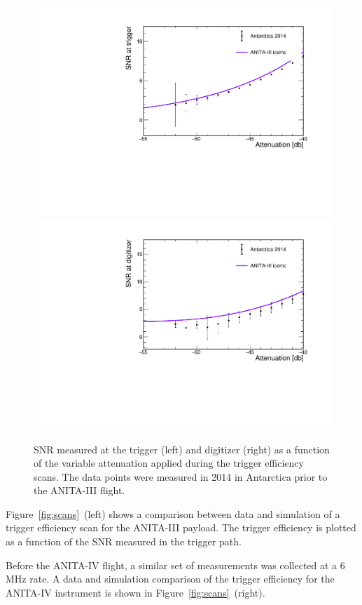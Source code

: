 \begin{figure}[!h]\centering
  \includegraphics[width=.45\linewidth]{./Figs/EfficiencyScanNoDelaysA3_snrTriggerVSattenuation.pdf} 
  \includegraphics[width=.45\linewidth]{./Figs/EfficiencyScanNoDelaysA3_snrDigitizerVSattenuation.pdf}
  \caption{SNR measured at the trigger (left) and digitizer (right) as
  a function of the variable attenuation applied during the trigger
  efficiency scans. The data points were measured in 2014 in Antarctica prior to the
  ANITA-III flight.
}
  \label{fig:scan_snr}
\end{figure}

Figure~\ref{fig:scans}~(left) shows a comparison between data and simulation of a trigger efficiency scan for the ANITA-III payload.
The trigger efficiency is plotted as a function of the SNR
measured in the trigger path.

Before the ANITA-IV flight, a similar set of measurements was collected at a 6\,MHz rate. 
A data and simulation comparison of the trigger efficiency for the ANITA-IV instrument is shown in Figure~\ref{fig:scans}~(right).

